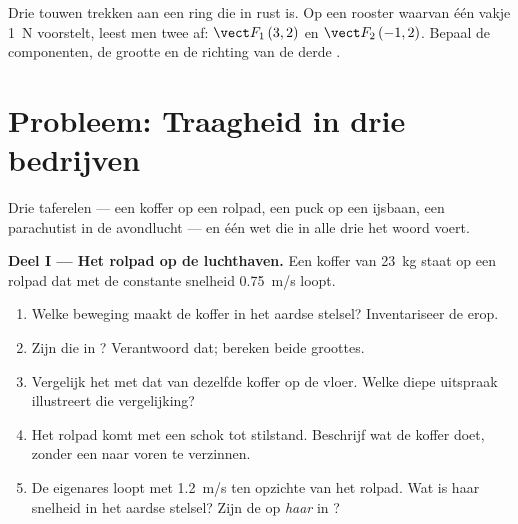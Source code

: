\begin{exercise}[$\star\star\star$]\label{exo:g10:inertia:15}
Drie touwen trekken aan een ring die in rust is. Op een rooster waarvan
één vakje \qty{1}{N} voorstelt, leest men twee  af:
$\vect F_1\,(3, 2)$ en $\vect F_2\,(-1, 2)$. Bepaal de componenten, de
grootte en de richting van de derde .
\end{exercise}

\section{Probleem: Traagheid in drie bedrijven}

\begin{problem}
\label{pb:g10:inertia:1}
Drie taferelen --- een koffer op een rolpad, een puck op een ijsbaan,
een parachutist in de avondlucht --- en één wet die in alle drie het
woord voert.

\medskip
\noindent\textbf{Deel I --- Het rolpad op de luchthaven.}
Een koffer van \qty{23}{kg} staat op een rolpad dat met de constante
snelheid \qty{0.75}{m/s} loopt.
\begin{enumerate}
  \item Welke beweging maakt de koffer in het aardse stelsel?
        Inventariseer de  erop.
  \item Zijn die  in ? Verantwoord dat; bereken beide
        groottes.
  \item Vergelijk het  met dat van dezelfde koffer op de
        vloer. Welke diepe uitspraak illustreert die vergelijking?
  \item Het rolpad komt met een schok tot stilstand. Beschrijf wat de
        koffer doet, zonder een  naar voren te verzinnen.
  \item De eigenares loopt met \qty{1.2}{m/s} ten opzichte van het
        rolpad. Wat is haar snelheid in het aardse stelsel? Zijn de
         op \emph{haar} in ?
\end{enumerate}


\end{problem}

